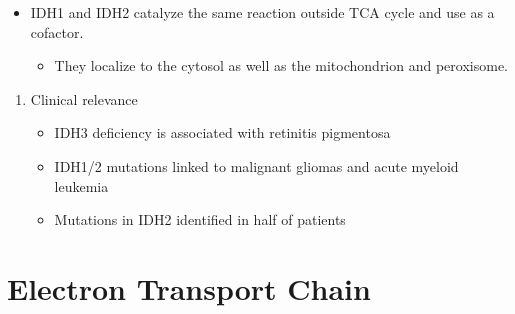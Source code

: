 \documentclass{scrartcl}
\begin{document}

\begin{itemize}
\item IDH1 and IDH2 catalyze the same reaction outside TCA cycle and use  as a cofactor.
\begin{itemize}
\item They localize to the cytosol as well as the mitochondrion and peroxisome.
\end{itemize}
\end{itemize}


\begin{enumerate}
\item Clinical relevance
\label{sec:orgf3a18da}
\begin{itemize}
\item IDH3 deficiency is associated with retinitis pigmentosa
\item IDH1/2 mutations linked to malignant gliomas and acute myeloid leukemia
\item Mutations in IDH2 identified in half of patients
\end{itemize}
\end{enumerate}
\section{Electron Transport Chain}
\label{sec:orgbc673f3}
\end{document}
